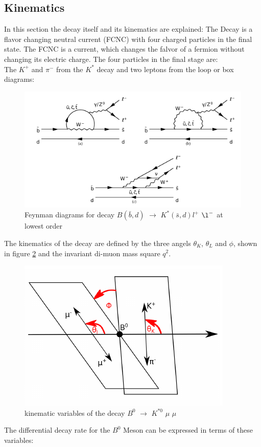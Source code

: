\documentclass[english]{uzhpub}
\begin{document}
 \subsection{Kinematics} \label{sec:Kinematics}
 In this section the decay itself and its kinematics are explained:
 The Decay is a flavor changing neutral current (FCNC) with four charged particles in the final state. The FCNC is a current, which changes the falvor of a fermion without changing its electric charge. The four particles in the final stage are:  \\
 The $K^+$ and $\pi^-$ from the $K^{*}$ decay and two leptons from the loop or box diagrams:
 \begin{figure}[H]
  \centering
  \includegraphics[width=0.8\linewidth]{KstarFeynman}
  \caption{Feynman diagrams for decay $B(\bar{b},d)$ $\rightarrow$ $ K^*(\bar{s},d) l^+$ $\l^-$ at lowest order}
  \label{fig:Feynman}
 \end{figure}
 The kinematics of the decay are defined by the three angels $\theta_K$, $\theta_L$ and $\phi$, shown in figure \ref{fig:angels} and the invariant di-muon mass square $q^2$.
 \begin{figure}[H]
  \centering
  \includegraphics[width=0.6\linewidth]{angels}
  \caption{kinematic variables of the decay $B^0$ $\rightarrow$ $K^{*0}$ $\mu$ $\mu$}
  \label{fig:angels}
 \end{figure}
The differential decay rate for the $B^0$ Meson can be expressed in terms of these variables:
\end{document}
